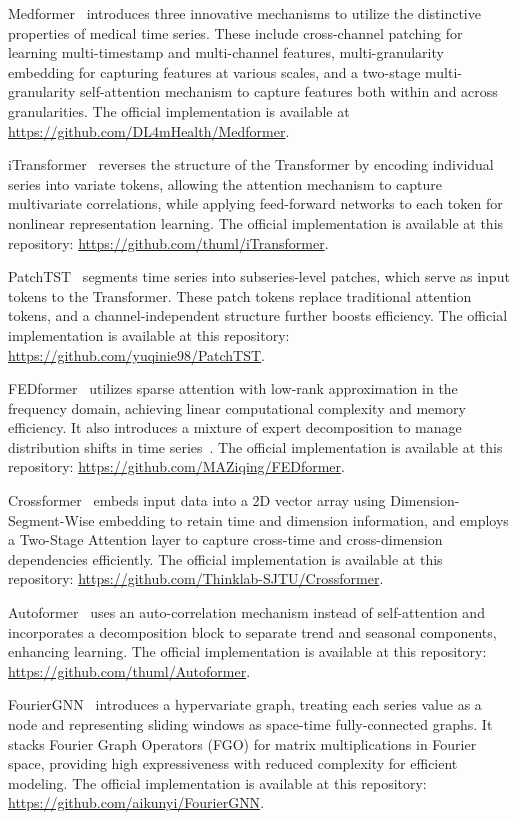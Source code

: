 Medformer~\cite{wang2024medformer} introduces three innovative mechanisms to utilize the distinctive properties of medical time series. These include cross-channel patching for learning multi-timestamp and multi-channel features, multi-granularity embedding for capturing features at various scales, and a two-stage multi-granularity self-attention mechanism to capture features both within and across granularities. The official implementation is available at \url{https://github.com/DL4mHealth/Medformer}.

iTransformer~\cite{liu2023itransformer} reverses the structure of the Transformer by encoding individual series into variate tokens, allowing the attention mechanism to capture multivariate correlations, while applying feed-forward networks to each token for nonlinear representation learning. The official implementation is available at this repository: \url{https://github.com/thuml/iTransformer}.

PatchTST~\cite{nie2022time} segments time series into subseries-level patches, which serve as input tokens to the Transformer. These patch tokens replace traditional attention tokens, and a channel-independent structure further boosts efficiency. The official implementation is available at this repository: \url{https://github.com/yuqinie98/PatchTST}.

FEDformer~\cite{zhou2022fedformer} utilizes sparse attention with low-rank approximation in the frequency domain, achieving linear computational complexity and memory efficiency. It also introduces a mixture of expert decomposition to manage distribution shifts in time series~\cite{fan2023Dish}. The official implementation is available at this repository: \url{https://github.com/MAZiqing/FEDformer}.

Crossformer~\cite{zhang2022crossformer} embeds input data into a 2D vector array using Dimension-Segment-Wise embedding to retain time and dimension information, and employs a Two-Stage Attention layer to capture cross-time and cross-dimension dependencies efficiently. The official implementation is available at this repository: \url{https://github.com/Thinklab-SJTU/Crossformer}.

Autoformer~\cite{wu2021autoformer} uses an auto-correlation mechanism instead of self-attention and incorporates a decomposition block to separate trend and seasonal components, enhancing learning. The official implementation is available at this repository: \url{https://github.com/thuml/Autoformer}.

FourierGNN~\cite{yi2024fouriergnn} introduces a hypervariate graph, treating each series value as a node and representing sliding windows as space-time fully-connected graphs. It stacks Fourier Graph Operators (FGO) for matrix multiplications in Fourier space, providing high expressiveness with reduced complexity for efficient modeling. The official implementation is available at this repository: \url{https://github.com/aikunyi/FourierGNN}.

